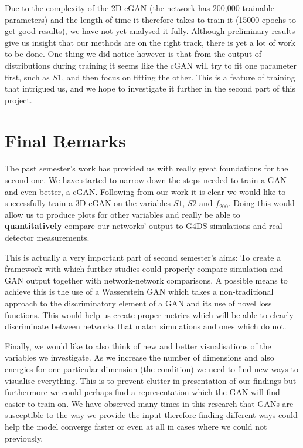 \documentclass[11pt]{article} %
\begin{document}
Due to the complexity of the 2D cGAN (the network has 200,000 trainable parameters) and the length of time it therefore takes to train it (15000 epochs to get good results), we have not yet analysed it fully. Although preliminary results give us insight that our methods are on the right track, there is yet a lot of work to be done. One thing we did notice however is that from the output of distributions during training it seems like the cGAN will try to fit one parameter first, such as $S1$, and then focus on fitting the other. This is a feature of training that intrigued us, and we hope to investigate it further in the second part of this project.

\section{Final Remarks}

The past semester's work has provided us with really great foundations for the second one. We have started to narrow down the steps needed to train a GAN and even better, a cGAN. Following from our work it is clear we would like to successfully train a 3D cGAN on the variables $S1$, $S2$ and $f_{200}$. Doing this would allow us to produce plots for other variables and really be able to \textbf{quantitatively} compare our networks' output to G4DS simulations and real detector measurements.
\newline

This is actually a very important part of second semester's aims: To create a framework with which further studies could properly compare simulation and GAN output together with network-network comparisons. A possible means to achieve this is the use of a Wasserstein GAN \cite{arjovsky2017wasserstein} which takes a non-traditional approach to the discriminatory element of a GAN and its use of novel loss functions. This would help us create proper metrics which will be able to clearly discriminate between networks that match simulations and ones which do not.
\newline

Finally, we would like to also think of new and better visualisations of the variables we investigate. As we increase the number of dimensions and also energies for one particular dimension (the condition) we need to find new ways to visualise everything. This is to prevent clutter in presentation of our findings but furthermore we could perhaps find a representation which the GAN will find easier to train on. We have observed many times in this research that GANs are susceptible to the way we provide the input therefore finding different ways could help the model converge faster or even at all in cases where we could not previously.
\newline
\end{document}
